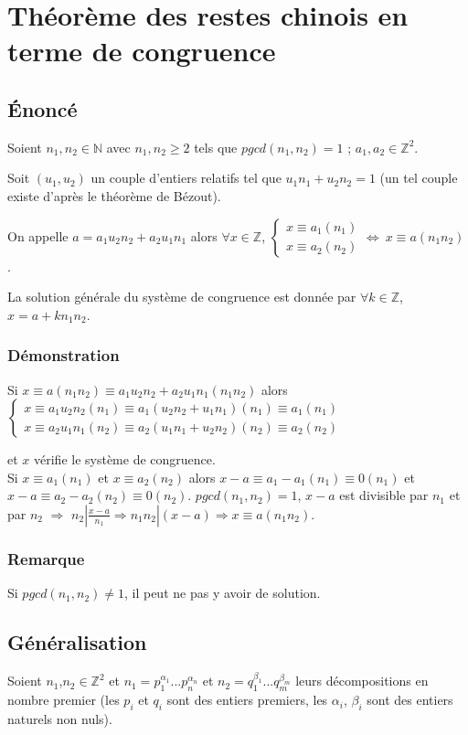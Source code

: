 \documentclass[a4paper,10pt]{book} %
\newcommand{\N}{\mathbb{N}}
\newcommand{\Z}{\mathbb{Z}}
\begin{document}
\section{Théorème des restes chinois en terme de congruence}
\subsection{Énoncé}
Soient $n_1,n_2\in \N$ avec $n_1,n_2\geq 2$ tels que $pgcd(n_1,n_2)=1$ ; $a_1,a_2 \in \Z^2$.\smallskip

Soit $(u_1,u_2)$ un couple d'entiers relatifs tel que $u_1n_1+u_2n_2=1$ (un tel couple existe d'après le théorème de Bézout).

On appelle $a=a_1u_2n_2+a_2u_1n_1$ alors $\forall x\in \Z$, $\left\{\begin{array}{c}x\equiv a_1(n_1)\\x\equiv a_2(n_2)\end{array}\right. \Leftrightarrow~x\equiv a(n_1n_2)$. \smallskip

La solution générale du système de congruence est donnée par $\forall k\in \Z$, $x=a+kn_1n_2$.

\subsubsection{Démonstration}
Si $x\equiv a(n_1n_2)\equiv a_1u_2n_2+a_2u_1n_1(n_1n_2)$ alors $\left\{\begin{array}{rcl}
x\equiv a_1u_2n_2(n_1)\equiv a_1(u_2n_2+u_1n_1)(n_1)\equiv a_1(n_1)\\
x\equiv a_2u_1n_1(n_2)\equiv a_2(u_1n_1+u_2n_2)(n_2)\equiv a_2(n_2)\end{array}\right.$

et $x$ vérifie le système de congruence.\\

Si $x\equiv a_1(n_1)$ et $x\equiv a_2(n_2)$ alors 
$x-a\equiv a_1-a_1(n_1)\equiv 0(n_1)$ et $x-a\equiv a_2-a_2(n_2)\equiv 0(n_2)$.
$pgcd(n_1,n_2)=1$, $x-a$ est divisible par $n_1$ et par $n_2$ $\Rightarrow$ $n_2|\frac{x-a}{n_1}\Rightarrow n_1n_2|(x-a)\Rightarrow x\equiv a(n_1n_2)$.

\subsubsection{Remarque}
Si $pgcd(n_1,n_2)\neq1$, il peut ne pas y avoir de solution.

\subsection{Généralisation}
Soient $n_1$,$n_2\in\Z^2$ et $n_1=p_1^{\alpha_1}...p_n^{\alpha_n}$ et $n_2=q_1^{\beta_1}...q_m^{\beta_m}$ leurs décompositions en nombre premier (les $p_i$ et $q_i$ sont des entiers premiers, les $\alpha_i$, $\beta_i$ sont des entiers naturels non nuls).\\
\end{document}
